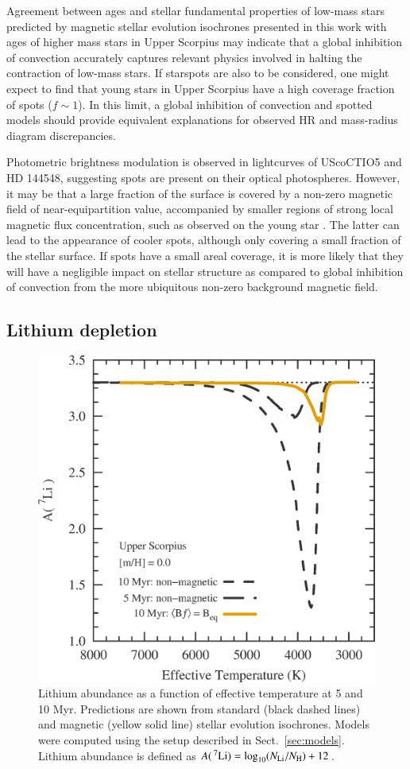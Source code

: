 \documentclass{aa}
\begin{document}
Agreement between ages and stellar fundamental properties of low-mass stars predicted by magnetic stellar evolution isochrones presented in this work with ages of higher mass stars in Upper Scorpius may indicate that a global inhibition of convection accurately captures relevant physics involved in halting the contraction of low-mass stars. If starspots are also to be considered, one might expect to find that young stars in Upper Scorpius have a high coverage fraction of spots ($f \sim 1$). In this limit, a global inhibition of convection and spotted models \citep[e.g.,][]{Somers2015b} should provide equivalent explanations for observed HR and mass-radius diagram discrepancies.

Photometric brightness modulation is observed in lightcurves of UScoCTIO5 and HD 144548, suggesting spots are present on their optical photospheres. However, it may be that a large fraction of the surface is covered by a non-zero magnetic field of near-equipartition value, accompanied by smaller regions of strong local magnetic flux concentration, such as observed on the young star  \citep{Shulyak2014}. The latter can lead to the appearance of cooler spots, although only covering a small fraction of the stellar surface. If spots have a small areal coverage, it is more likely that they will have a negligible impact on stellar structure as compared to global inhibition of convection from the more ubiquitous non-zero background magnetic field.

\subsection{Lithium depletion}


\begin{figure}[t]
    \includegraphics[width=0.85\linewidth]{Li7_USco_Beq.eps}
    \caption{Lithium abundance  as a function of effective temperature at 5 and 10 Myr. Predictions are shown from standard (black dashed lines) and magnetic (yellow solid line) stellar evolution isochrones. Models were computed using the setup described in Sect.~\ref{sec:models}. Lithium abundance is defined as $A(\,^7{\rm Li}) = \log_{10}(N_{\rm Li}/N_{\rm H}) + 12$.}
    \label{fig:lithium}
\end{figure}
\end{document}

